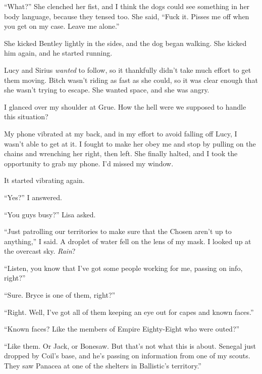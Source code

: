 ``What?''  She clenched her fist, and I think the dogs could see something in her body language, because they tensed too.  She said, ``Fuck it.  Pisses me off when you get on my case.  Leave me alone.''



She kicked Bentley lightly in the sides, and the dog began walking.  She kicked him again, and he started running.



Lucy and Sirius \emph{wanted} to follow, so it thankfully didn't take much effort to get them moving.  Bitch wasn't riding as fast as she could, so it was clear enough that she wasn't trying to escape.  She wanted space, and she was angry.



I glanced over my shoulder at Grue.  How the hell were we supposed to handle this situation?



My phone vibrated at my back, and in my effort to avoid falling off Lucy, I wasn't able to get at it.  I fought to make her obey me and stop by pulling on the chains and wrenching her right, then left.  She finally halted, and I took the opportunity to grab my phone.  I'd missed my window.



It started vibrating again.



``Yes?'' I answered.



``You guys busy?'' Lisa asked.



``Just patrolling our territories to make sure that the Chosen aren't up to anything,'' I said.  A droplet of water fell on the lens of my mask.  I looked up at the overcast sky.  \emph{Rain}?



``Listen, you know that I've got some people working for me, passing on info, right?''



``Sure.  Bryce is one of them, right?''



``Right.  Well, I've got all of them keeping an eye out for capes and known faces.''



``Known faces?  Like the members of Empire Eighty-Eight who were outed?''



``Like them.  Or Jack, or Bonesaw.  But that's not what this is about.  Senegal just dropped by Coil's base, and he's passing on information from one of my scouts.  They saw Panacea at one of the shelters in Ballistic's territory.''



